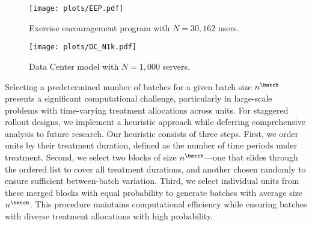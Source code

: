 \begin{figure}
    \centering
    \texttt{[image: plots/EEP.pdf]}
    \caption{Exercise encouragement program with $N=30,162$ users.}
    \label{fig:EP}
\end{figure}

\begin{figure}
    \centering
    \texttt{[image: plots/DC\_N1k.pdf]}
    \caption{Data Center model with $N=1,000$ servers.}
    \label{fig:DC}
\end{figure}

\begin{remark}
    \label{rem:batch_generation}
    Selecting a predetermined number of batches for a given batch size $n^\batch$ presents a significant computational challenge, particularly in large-scale problems with time-varying treatment allocations across units. For staggered rollout designs, we implement a heuristic approach while deferring comprehensive analysis to future research. Our heuristic consists of three steps. First, we order units by their treatment duration, defined as the number of time periods under treatment. Second, we select two blocks of size $n^\batch$—one that slides through the ordered list to cover all treatment durations, and another chosen randomly to ensure sufficient between-batch variation. Third, we select individual units from these merged blocks with equal probability to generate batches with average size $n^\batch$. This procedure maintains computational efficiency while ensuring batches with diverse treatment allocations with high probability.
\end{remark}